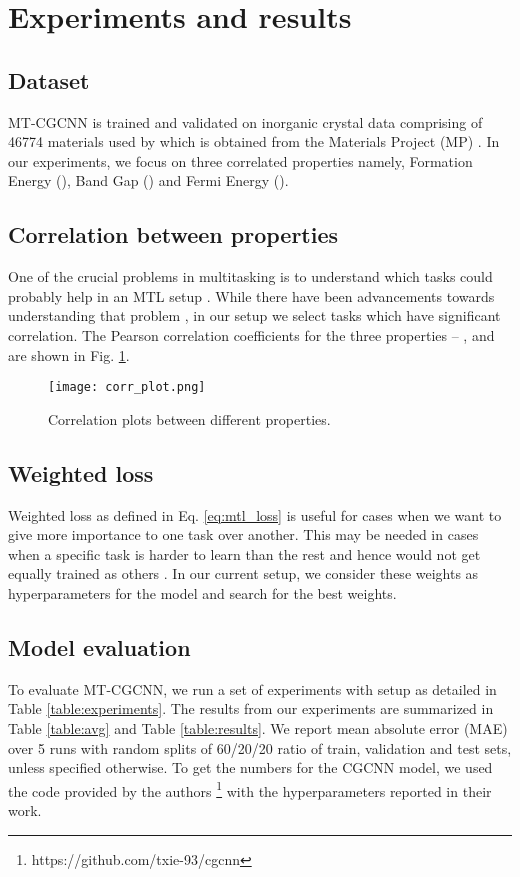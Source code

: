 \documentclass{article}
\newcommand{\method}[1]{MT-CGCNN}
\newcommand{\baseline}[1]{CGCNN}
\newcommand{\propone}[1]{Formation Energy}
\newcommand{\proponesym}[1]{}
\newcommand{\proptwo}[1]{Band Gap}
\newcommand{\proptwosym}[1]{}
\newcommand{\propthree}[1]{Fermi Energy}
\newcommand{\propthreesym}[1]{}
\begin{document}
 \section{Experiments and results}

\subsection{Dataset}
\label{sec:dataset}
MT-CGCNN is trained and validated on inorganic crystal data comprising of 46774 materials used by \citet{CGCNN} which is obtained from the Materials Project (MP) \citep{Jain2013}. In our experiments, we focus on three correlated properties namely, \propone{} (\proponesym{}), \proptwo{} (\proptwosym{}) and \propthree{} (\propthreesym{}).

\subsection{Correlation between properties}
\label{sec:correlation}
One of the crucial problems in multitasking is to understand which tasks could probably help in an MTL setup \cite{Caruana1997, Ruder17a}. While there have been advancements towards understanding that problem \cite{Xu17, Bingel17}, in our setup we select tasks which have significant correlation. The Pearson correlation coefficients \citep{benesty2009pearson} for the three properties -- \proponesym{}, \proptwosym{} and \propthreesym{} are shown in Fig. \ref{fig:correlation}.

\begin{figure}[htp]

\centering
\texttt{[image: corr\_plot.png]}\hfill
\caption{Correlation plots between different properties.}
\label{fig:correlation}

\end{figure}

\subsection{Weighted loss}
Weighted loss as defined in Eq. \ref{eq:mtl_loss} is useful for cases when we want to give more importance to one task over another. This may be needed in cases when a specific task is harder to learn than the rest and hence would not get equally trained as others \cite{Gradnorm17}. In our current setup, we consider these weights as hyperparameters for the model and search for the best weights.

\subsection{Model evaluation}
\label{sec:results}
To evaluate \method{}, we run a set of experiments with setup as detailed in Table \ref{table:experiments}. The results from our experiments are summarized in Table \ref{table:avg} and Table \ref{table:results}. We report mean absolute error (MAE) over 5 runs with random splits of 60/20/20 ratio of train, validation and test sets, unless specified otherwise. To get the numbers for the \baseline{} model, we used the code provided by the authors \footnote{https://github.com/txie-93/cgcnn} with the hyperparameters reported in their work.
\end{document}
